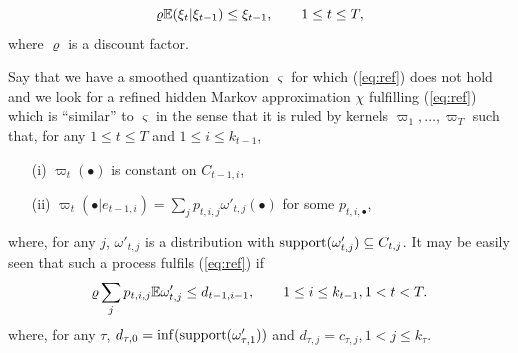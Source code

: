 \documentclass{article}              %
\begin{document}
\begin{equation}
\varrho\mathbb{E}(\xi_{t}|\xi_{t-1})\leq\xi_{t-1},\qquad1\leq t\leq T,\label{eq:ref}
\end{equation}
where $\varrho$ is a discount factor. 

Say that we have a smoothed quantization
$\varsigma$ for which (\ref{eq:ref}) does not hold and we look for a refined
hidden Markov approximation $\chi$ fulfilling (\ref{eq:ref}) which
is ``similar'' to $\varsigma$ in the sense that it is ruled by
kernels $\varpi_{1},\dots,\varpi_{T}$ such that, for any  $1\leq t \leq T$ and $1\leq i \leq k_{t-1}$,
\begin{itemize}
\item[(i)] $\varpi_{t}(\bullet)$ is constant on $C_{t-1,i}$,
\item[(ii)] $\varpi_{t}(\bullet|e_{t-1,i})=\sum_{j}p_{t,i,j}\omega'_{t,j}(\bullet)$ for some 
$p_{t,i,\bullet}$,
\end{itemize}
where, for any $j$, $\omega'_{t,j}$ is a distribution with $\mathrm{support}(\omega'_{t,j})\subseteq C_{t,j}$.  It may be easily seen that such a
process fulfils (\ref{eq:ref}) if
\begin{equation}
\varrho\sum_{j}p_{t,i,j}\mathbb{E}\omega'_{t,j}\leq d_{t-1,i-1},\qquad1\leq i\leq k_{t-1},1<t<T.\label{eq:refneeded}
\end{equation}
where, for any $\tau$, $d_{\tau,0}=\inf(\mathrm{support}(\omega'_{\tau,1}))$ and $d_{\tau,j}=c_{\tau,j},1<j\leq k_{\tau}.$
\end{document}
